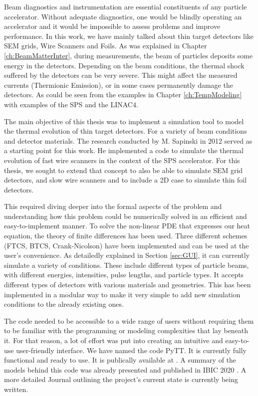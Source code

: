 \pagestyle{fancy}

Beam diagnostics and instrumentation are essential constituents of any particle accelerator. Without adequate diagnostics, one would be blindly operating an accelerator and it would be impossible to assess problems and improve performance. In this work, we have mainly talked about thin target detectors like SEM grids, Wire Scanners and Foils. As was explained in Chapter \ref{ch:BeamMatterInter}, during measurements, the beam of particles deposits some energy in the detectors. Depending on the beam conditions, the thermal shock suffered by the detectors can be very severe. This might affect the measured currents (Thermionic Emission), or in some cases permanently damage the detectors. As could be seen from the examples in Chapter \ref{ch:TempModeling} with examples of the SPS and the LINAC4. 

The main objective of this thesis was to implement a simulation tool to model the thermal evolution of thin target detectors. For a variety of beam conditions and detector materials. The research conducted by M. Sapinski in 2012 \parencite[]{ref:Msapinski} served as a starting point for this work. He implemented a code to simulate the thermal evolution of fast wire scanners in the context of the SPS accelerator. For this thesis, we sought to extend that concept to also be able to simulate SEM grid detectors, and slow wire scanners and to include a 2D case to simulate thin foil detectors.  

This required diving deeper into the formal aspects of the problem and understanding how this problem could be numerically solved in an efficient and easy-to-implement manner. To solve the non-linear PDE that expresses our heat equation, the theory of finite differences has been used. Three different schemes (FTCS, BTCS, Crank-Nicolson) have been implemented and can be used at the user's convenience. As detailedly explained in Section \ref{sec:GUI}, it can currently simulate a variety of conditions. These include different types of particle beams, with different energies, intensities, pulse lengths, and particle types. It accepts different types of detectors with various materials and geometries. This has been implemented in a modular way to make it very simple to add new simulation conditions to the already existing ones.


The code needed to be accessible to a wide range of users without requiring them to be familiar with the programming or modeling complexities that lay beneath it. For that reason, a lot of effort was put into creating an intuitive and easy-to-use user-friendly interface.  We have named the code PyTT. It is currently fully functional and ready to use. It is publically available at \parencite[]{ref:GitAra}.  A summary of the models behind this code was already presented and published in IBIC 2020 \parencite[][]{ref:IBIC2019ARaceli}. A more detailed Journal outlining the project's current state is currently being written. 

